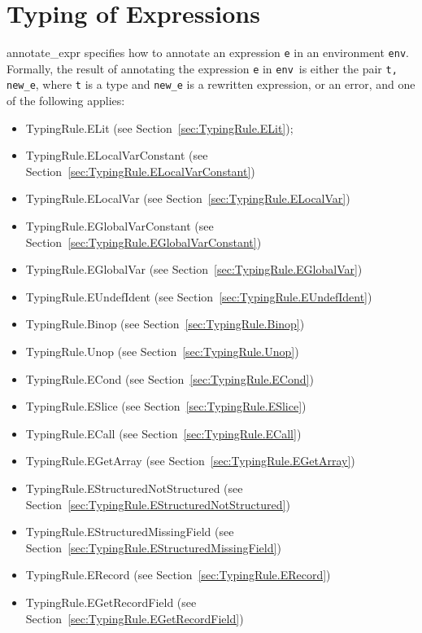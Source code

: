 \documentclass{book}
\newcommand\tenv[0]{\texttt{env}}
\begin{document}
\chapter{Typing of Expressions}

\textsf{annotate\_expr} specifies how to annotate an expression \texttt{e} in
an environment \tenv.  Formally, the result of annotating the expression
\texttt{e} in \tenv\ is either the pair \texttt{t, new\_e}, where \texttt{t} is a type and
\texttt{new\_e} is a rewritten expression, or an error, and one of the following applies:
\begin{itemize}
\item TypingRule.ELit (see Section~\ref{sec:TypingRule.ELit});
\item TypingRule.ELocalVarConstant (see Section~\ref{sec:TypingRule.ELocalVarConstant})
\item TypingRule.ELocalVar (see Section~\ref{sec:TypingRule.ELocalVar})
\item TypingRule.EGlobalVarConstant (see Section~\ref{sec:TypingRule.EGlobalVarConstant})
\item TypingRule.EGlobalVar (see Section~\ref{sec:TypingRule.EGlobalVar})
\item TypingRule.EUndefIdent (see Section~\ref{sec:TypingRule.EUndefIdent})
\item TypingRule.Binop (see Section~\ref{sec:TypingRule.Binop})
\item TypingRule.Unop (see Section~\ref{sec:TypingRule.Unop})
\item TypingRule.ECond (see Section~\ref{sec:TypingRule.ECond})
\item TypingRule.ESlice (see Section~\ref{sec:TypingRule.ESlice})
\item TypingRule.ECall (see Section~\ref{sec:TypingRule.ECall})
\item TypingRule.EGetArray (see Section~\ref{sec:TypingRule.EGetArray})
\item TypingRule.EStructuredNotStructured (see Section~\ref{sec:TypingRule.EStructuredNotStructured})
\item TypingRule.EStructuredMissingField (see Section~\ref{sec:TypingRule.EStructuredMissingField})
\item TypingRule.ERecord (see Section~\ref{sec:TypingRule.ERecord})
\item TypingRule.EGetRecordField (see Section~\ref{sec:TypingRule.EGetRecordField})

\end{itemize}
\end{document}
